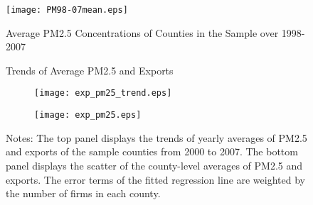 \documentclass[12pt]{article}
\begin{document}
  \begin{figure}[H]\centering
    \caption{Average PM2.5 Concentrations of Counties in the Sample over 1998-2007 }\label{fig:3}
    \texttt{[image: PM98-07mean.eps]}
  \end{figure}

\begin{figure}
\centering
\caption{Trends of Average PM2.5 and Exports}\label{fig:4}
\begin{subfigure}[b]{.75\textwidth}
\centering
\texttt{[image: exp\_pm25\_trend.eps]}
        \caption{}\label{fig:fig_a}
\end{subfigure}
%
\begin{subfigure}[b]{.75\textwidth}
\centering
\texttt{[image: exp\_pm25.eps]}
\caption{}\label{fig:fig_b}
\end{subfigure}
\caption*{Notes: The top panel displays the trends of yearly averages of PM2.5 and exports of the sample counties from 2000 to 2007. The bottom panel displays the scatter of the county-level averages of PM2.5 and exports. The error terms of the fitted regression line are weighted by the number of firms in each county.}
\end{figure}



    \newpage
    \renewcommand \thepart{}
    \renewcommand \partname{}
    \doparttoc %
    \faketableofcontents %
    \appendix
    \setcounter{table}{0}
    \renewcommand{\thetable}{A\arabic{table}}
\end{document}
